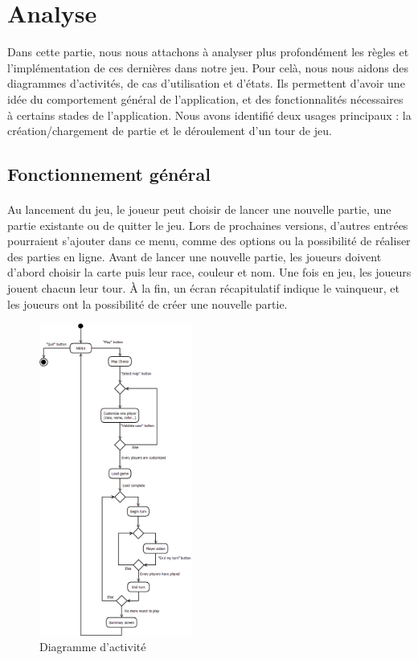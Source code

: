 \section{Analyse}

Dans cette partie, nous nous attachons à analyser plus profondément les règles et l'implémentation de ces dernières dans notre jeu. Pour celà, nous nous aidons des diagrammes d'activités, de cas d'utilisation et d'états. Ils permettent d'avoir une idée du comportement général de l'application, et des fonctionnalités nécessaires à certains stades de l'application. Nous avons identifié deux usages principaux : la création/chargement de partie et le déroulement d'un tour de jeu.

\subsection{Fonctionnement général}

\paragraph{}
Au lancement du jeu, le joueur peut choisir de lancer une nouvelle partie, une partie existante ou de quitter le jeu. Lors de prochaines versions, d'autres entrées pourraient s'ajouter dans ce menu, comme des options ou la possibilité de réaliser des parties en ligne. Avant de lancer une nouvelle partie, les joueurs doivent d'abord choisir la carte puis leur race, couleur et nom. Une fois en jeu, les joueurs jouent chacun leur tour. À la fin, un écran récapitulatif indique le vainqueur, et les joueurs ont la possibilité de créer une nouvelle partie.

\begin{figure}[h]
  \centering
  \includegraphics[width=5cm]{schemas/activity.png}
  \caption{Diagramme d'activité}
  \label{activity}
\end{figure}

